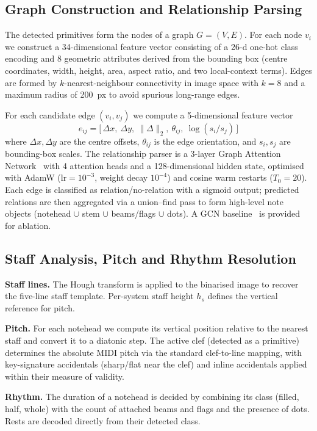\documentclass[conference]{IEEEtran}
\begin{document}
\subsection{Graph Construction and Relationship Parsing}\label{sec:gat}
The detected primitives form the nodes of a graph $G=(V,E)$. For each node
$v_i$ we construct a 34-dimensional feature vector consisting of a 26-d
one-hot class encoding and 8 geometric attributes derived from the bounding
box (centre coordinates, width, height, area, aspect ratio, and two
local-context terms). Edges are formed by $k$-nearest-neighbour connectivity
in image space with $k=8$ and a maximum radius of 200~px to avoid spurious
long-range edges.

For each candidate edge $(v_i,v_j)$ we compute a 5-dimensional feature vector
\[
e_{ij} = \big[\,\Delta x,\ \Delta y,\ \lVert\Delta\rVert_2,\ \theta_{ij},\
\log(s_i/s_j)\,\big]
\]
where $\Delta x,\Delta y$ are the centre offsets, $\theta_{ij}$ is the edge
orientation, and $s_i,s_j$ are bounding-box scales. The relationship parser is
a 3-layer Graph Attention Network~\cite{velickovic2018graph} with 4 attention
heads and a 128-dimensional hidden state, optimised with AdamW
($\text{lr}=10^{-3}$, weight decay $10^{-4}$) and cosine warm restarts
($T_0=20$). Each edge is classified as relation/no-relation with a sigmoid
output; predicted relations are then aggregated via a union--find pass to form
high-level note objects (notehead $\cup$ stem $\cup$ beams/flags $\cup$ dots).
A GCN baseline~\cite{kipf2017semi} is provided for ablation.

\subsection{Staff Analysis, Pitch and Rhythm Resolution}
\label{sec:sequencing}
\textbf{Staff lines.} The Hough transform is applied to the binarised image to
recover the five-line staff template. Per-system staff height $h_s$ defines
the vertical reference for pitch.

\textbf{Pitch.} For each notehead we compute its vertical position relative to
the nearest staff and convert it to a diatonic step. The active clef
(detected as a primitive) determines the absolute MIDI pitch via the standard
clef-to-line mapping, with key-signature accidentals (sharp/flat near the
clef) and inline accidentals applied within their measure of validity.

\textbf{Rhythm.} The duration of a notehead is decided by combining its class
(filled, half, whole) with the count of attached beams and flags and the
presence of dots. Rests are decoded directly from their detected class.
\end{document}
